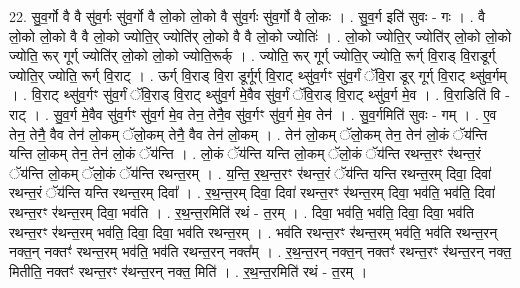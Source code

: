 \documentclass[17pt]{extarticle}
\begin{document}
22. सु॒व॒र्गो वै वै सु॑व॒र्गः सु॑व॒र्गो वै लो॒को लो॒को वै सु॑व॒र्गः सु॑व॒र्गो वै लो॒कः । . सु॒व॒र्ग इति॑ सुवः - गः । . वै लो॒को लो॒को वै वै लो॒को ज्योति॒र् ज्योति॑र् लो॒को वै वै लो॒को ज्योतिः॑ । . लो॒को ज्योति॒र् ज्योति॑र् लो॒को लो॒को ज्योति॒ रूर् गूर्ग् ज्योति॑र् लो॒को लो॒को ज्योति॒रूर्क् । . ज्योति॒ रूर् गूर्ग् ज्योति॒र् ज्योति॒ रूर्ग् वि॒राड् वि॒राडूर्ग् ज्योति॒र् ज्योति॒ रूर्ग् वि॒राट् । . ऊर्ग् वि॒राड् वि॒रा डूर्गूर्ग् वि॒राट् थ्सु॑व॒र्गꣳ सु॑व॒र्गं ॅवि॒रा डूर् गूर्ग् वि॒राट् थ्सु॑व॒र्गम् । . वि॒राट् थ्सु॑व॒र्गꣳ सु॑व॒र्गं ॅवि॒राड् वि॒राट् थ्सु॑व॒र्ग मे॒वैव सु॑व॒र्गं ॅवि॒राड् वि॒राट् थ्सु॑व॒र्ग मे॒व । . वि॒राडिति॑ वि - राट् । . सु॒व॒र्ग मे॒वैव सु॑व॒र्गꣳ सु॑व॒र्ग मे॒व तेन॒ तेनै॒व सु॑व॒र्गꣳ सु॑व॒र्ग मे॒व तेन॑ । . सु॒व॒र्गमिति॑ सुवः - गम् । . ए॒व तेन॒ तेनै॒ वैव तेन॑ लो॒कम् ॅलो॒कम् तेनै॒ वैव तेन॑ लो॒कम् । . तेन॑ लो॒कम् ॅलो॒कम् तेन॒ तेन॑ लो॒कं ॅय॑न्ति यन्ति लो॒कम् तेन॒ तेन॑ लो॒कं ॅय॑न्ति । . लो॒कं ॅय॑न्ति यन्ति लो॒कम् ॅलो॒कं ॅय॑न्ति रथन्त॒रꣳ र॑थन्त॒रं ॅय॑न्ति लो॒कम् ॅलो॒कं ॅय॑न्ति रथन्त॒रम् । . य॒न्ति॒ र॒थ॒न्त॒रꣳ र॑थन्त॒रं ॅय॑न्ति यन्ति रथन्त॒रम् दिवा॒ दिवा॑ रथन्त॒रं ॅय॑न्ति यन्ति रथन्त॒रम् दिवा᳚ । . र॒थ॒न्त॒रम् दिवा॒ दिवा॑ रथन्त॒रꣳ र॑थन्त॒रम् दिवा॒ भव॑ति॒ भव॑ति॒ दिवा॑ रथन्त॒रꣳ र॑थन्त॒रम् दिवा॒ भव॑ति । . र॒थ॒न्त॒रमिति॑ रथं - त॒रम् । . दिवा॒ भव॑ति॒ भव॑ति॒ दिवा॒ दिवा॒ भव॑ति रथन्त॒रꣳ र॑थन्त॒रम् भव॑ति॒ दिवा॒ दिवा॒ भव॑ति रथन्त॒रम् । . भव॑ति रथन्त॒रꣳ र॑थन्त॒रम् भव॑ति॒ भव॑ति रथन्त॒रन् नक्त॒न् नक्तꣳ॑ रथन्त॒रम् भव॑ति॒ भव॑ति रथन्त॒रन् नक्त᳚म् । . र॒थ॒न्त॒रन् नक्त॒न् नक्तꣳ॑ रथन्त॒रꣳ र॑थन्त॒रन् नक्त॒ मितीति॒ नक्तꣳ॑ रथन्त॒रꣳ र॑थन्त॒रन् नक्त॒ मिति॑ । . र॒थ॒न्त॒रमिति॑ रथं - त॒रम् । \newline
\end{document}
